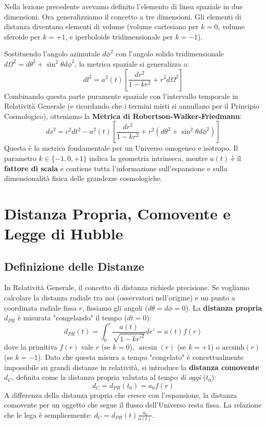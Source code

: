\documentclass[11pt,a4paper]{report}
\begin{document}
Nella lezione precedente avevamo definito l'elemento di linea spaziale in due dimensioni. Ora generalizziamo il concetto a tre dimensioni. Gli elementi di distanza diventano elementi di volume (volume cartesiano per $k=0$, volume sferoide per $k=+1$, e iperboloide tridimensionale per $k=-1$). 

Sostituendo l'angolo azimutale $d\phi^2$ con l'angolo solido tridimensionale $d\Omega^2 = d\theta^2 + \sin^2\theta d\phi^2$, la metrica spaziale si generalizza a:
\begin{equation}
dl^2 = a^2(t) \left[ \frac{dr^2}{1-kr^2} + r^2 d\Omega^2 \right]
\end{equation}
Combinando questa parte puramente spaziale con l'intervallo temporale in Relatività Generale (e ricordando che i termini misti si annullano per il Principio Cosmologico), otteniamo la \textbf{Metrica di Robertson-Walker-Friedmann}:
\begin{equation}
ds^2 = c^2 dt^2 - a^2(t) \left[ \frac{dr^2}{1-kr^2} + r^2(d\theta^2 + \sin^2\theta d\phi^2) \right]
\end{equation}
Questa è la metrica fondamentale per un Universo omogeneo e isotropo. Il parametro $k \in \{-1, 0, +1\}$ indica la geometria intrinseca, mentre $a(t)$ è il \textbf{fattore di scala} e contiene tutta l'informazione sull'espansione e sulla dimensionalità fisica delle grandezze cosmologiche.

\section{Distanza Propria, Comovente e Legge di Hubble}

\subsection{Definizione delle Distanze}
In Relatività Generale, il concetto di distanza richiede precisione. Se vogliamo calcolare la distanza radiale tra noi (osservatori nell'origine) e un punto a coordinata radiale fissa $r$, fissiamo gli angoli ($d\theta = d\phi = 0$). 
La \textbf{distanza propria} $d_{PR}$ è misurata "congelando" il tempo ($dt=0$):
\begin{equation}
d_{PR}(t) = \int_0^r \frac{a(t)}{\sqrt{1-kr'^2}} dr' = a(t) f(r)
\end{equation}
dove la primitiva $f(r)$ vale $r$ (se $k=0$), $\arcsin(r)$ (se $k=+1$) o $\text{arcsinh}(r)$ (se $k=-1$). 
Dato che questa misura a tempo "congelato" è concettualmente impossibile su grandi distanze in relatività, si introduce la \textbf{distanza comovente} $d_C$, definita come la distanza propria valutata al tempo \textit{di oggi} ($t_0$):
\begin{equation}
d_C = d_{PR}(t_0) = a_0 f(r)
\end{equation}
A differenza della distanza propria che cresce con l'espansione, la distanza comovente per un oggetto che segue il flusso dell'Universo resta fissa. La relazione che le lega è semplicemente: $d_C = d_{PR}(t) \frac{a_0}{a(t)}$.
\end{document}
